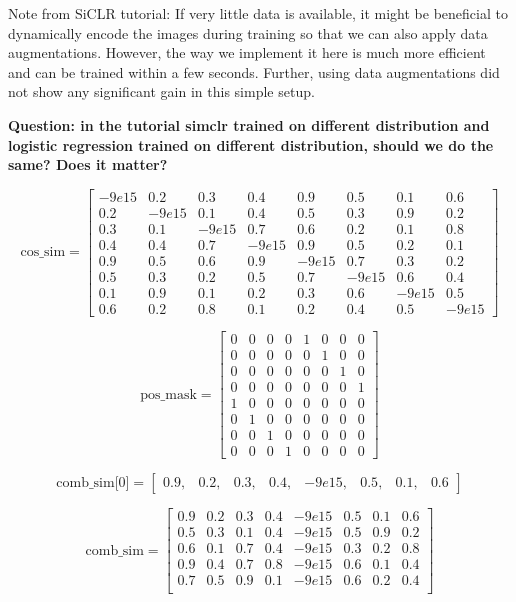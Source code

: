 \documentclass[12pt,twoside,a4paper,parskip]{scrbook} %
\begin{document}
Note from SiCLR tutorial: If very little data is available, it might be beneficial to dynamically encode the images during training so that we can also apply data augmentations. However, the way we implement it here is much more efficient and can be trained within a few seconds. Further, using data augmentations did not show any significant gain in this simple setup.

\textbf{Question: in the tutorial simclr trained on different distribution and logistic regression trained on different distribution, should we do the same? Does it matter?} 

\[
\text{cos\_sim} = \begin{bmatrix} 
-9e15 & 0.2 & 0.3 & 0.4 & 0.9 & 0.5 & 0.1 & 0.6 \\ 
0.2 & -9e15 & 0.1 & 0.4 & 0.5 & 0.3 & 0.9 & 0.2 \\ 
0.3 & 0.1 & -9e15 & 0.7 & 0.6 & 0.2 & 0.1 & 0.8 \\ 
0.4 & 0.4 & 0.7 & -9e15 & 0.9 & 0.5 & 0.2 & 0.1 \\ 
0.9 & 0.5 & 0.6 & 0.9 & -9e15 & 0.7 & 0.3 & 0.2 \\ 
0.5 & 0.3 & 0.2 & 0.5 & 0.7 & -9e15 & 0.6 & 0.4 \\ 
0.1 & 0.9 & 0.1 & 0.2 & 0.3 & 0.6 & -9e15 & 0.5 \\ 
0.6 & 0.2 & 0.8 & 0.1 & 0.2 & 0.4 & 0.5 & -9e15 
\end{bmatrix}
\]

\[
\text{pos\_mask} = \begin{bmatrix} 
0 & 0 & 0 & 0 & 1 & 0 & 0 & 0 \\
0 & 0 & 0 & 0 & 0 & 1 & 0 & 0 \\ 
0 & 0 & 0 & 0 & 0 & 0 & 1 & 0 \\ 
0 & 0 & 0 & 0 & 0 & 0 & 0 & 1 \\ 
1 & 0 & 0 & 0 & 0 & 0 & 0 & 0 \\ 
0 & 1 & 0 & 0 & 0 & 0 & 0 & 0 \\ 
0 & 0 & 1 & 0 & 0 & 0 & 0 & 0 \\ 
0 & 0 & 0 & 1 & 0 & 0 & 0 & 0 
\end{bmatrix}
\]

\[
\text{comb\_sim[0]} = \begin{bmatrix} 
0.9, & 0.2, & 0.3, & 0.4, & -9e15, & 0.5, & 0.1, & 0.6
\end{bmatrix}
\]

\[
\text{comb\_sim} = \begin{bmatrix} 
0.9 & 0.2 & 0.3 & 0.4 & -9e15 & 0.5 & 0.1 & 0.6 \\ 
0.5 & 0.3 & 0.1 & 0.4 & -9e15 & 0.5 & 0.9 & 0.2 \\ 
0.6 & 0.1 & 0.7 & 0.4 & -9e15 & 0.3 & 0.2 & 0.8 \\ 
0.9 & 0.4 & 0.7 & 0.8 & -9e15 & 0.6 & 0.1 & 0.4 \\ 
0.7 & 0.5 & 0.9 & 0.1 & -9e15 & 0.6 & 0.2 & 0.4 \\ 
\end{bmatrix}
\]
\end{document}
